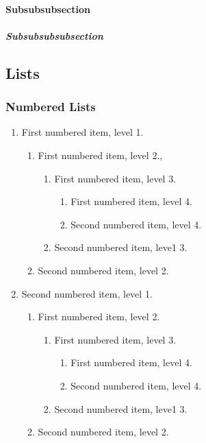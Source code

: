 \documentclass{article}
\begin{document}
\paragraph[Short Form]{Subsubsubsection}

\subparagraph[Short Form]{Subsubsubsubsection}

\subsection{Lists}

\subsubsection{Numbered Lists}

\begin{enumerate}
\item First numbered item, level 1.\label{A}

\begin{enumerate}
\item First numbered item, level 2.,\label{AA}

\begin{enumerate}
\item First numbered item, level 3.\label{AAA}

\begin{enumerate}
\item First numbered item, level 4.\label{AAAA}

\item Second numbered item, level 4.\label{AAAB}
\end{enumerate}

\item Second numbered item, leve1 3.\label{AAB}
\end{enumerate}

\item Second numbered item, level 2.\label{AB}
\end{enumerate}

\item Second numbered item, level 1.\label{B}

\begin{enumerate}
\item First numbered item, level 2.\label{BA}

\begin{enumerate}
\item First numbered item, level 3.\label{BAA}

\begin{enumerate}
\item First numbered item, level 4.\label{BAAA}

\item Second numbered item, level 4.\label{BAAB}
\end{enumerate}

\item Second numbered item, leve1 3.\label{BAB}
\end{enumerate}

\item Second numbered item, level 2.\label{BB}
\end{enumerate}
\end{enumerate}
\end{document}
